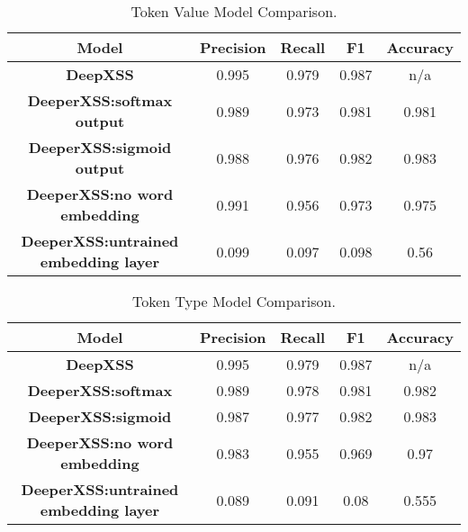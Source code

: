 \begin{table}
\begin{center}
\begingroup
\setlength{\tabcolsep}{4pt} %
\renewcommand{\arraystretch}{1.5} %
\begin{tabular}{|| c | c | c | c | c ||} 
    \hline
    Model & Precision & Recall & F1 & Accuracy \\ 
    \hline\hline
    \textbf{DeepXSS} &  0.995 & 0.979 & 0.987 & n/a \\ 
    \hline
    \textbf{DeeperXSS:softmax output} & 0.989 & 0.973 & 0.981 & 0.981 \\
    \hline
    \textbf{DeeperXSS:sigmoid output} & 0.988 & 0.976 & 0.982 & 0.983 \\
    \hline
    \textbf{DeeperXSS:no word embedding} & 0.991 & 0.956 & 0.973 & 0.975 \\
    \hline
    \textbf{DeeperXSS:untrained embedding layer} & 0.099 & 0.097 & 0.098 & 0.56 \\
    \hline
\end{tabular}
\endgroup
\caption{\label{comparison}Token Value Model Comparison.}
\end{center}
\end{table}

\begin{table}
    \begin{center}
    \begingroup
    \setlength{\tabcolsep}{4pt} %
    \renewcommand{\arraystretch}{1.5} %
    \begin{tabular}{|| c | c | c | c | c ||} 
        \hline
        Model & Precision & Recall & F1 & Accuracy \\ 
        \hline\hline
        \textbf{DeepXSS} &  0.995 & 0.979 & 0.987 & n/a \\ 
        \hline
        \textbf{DeeperXSS:softmax} & 0.989 & 0.978 & 0.981 & 0.982 \\
        \hline
        \textbf{DeeperXSS:sigmoid} & 0.987 & 0.977 & 0.982 & 0.983 \\
        \hline
        \textbf{DeeperXSS:no word embedding} & 0.983 & 0.955 & 0.969 & 0.97 \\
        \hline
        \textbf{DeeperXSS:untrained embedding layer} & 0.089 & 0.091 & 0.08 & 0.555 \\
        \hline
    \end{tabular}
    \endgroup
    \caption{\label{type:comparison}Token Type Model Comparison.}
    \end{center}
    \end{table}